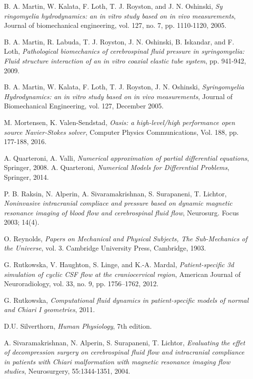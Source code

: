 \documentclass[a4paper,11pt,oneside]{book}
\begin{document}
\begin{thebibliography}{100}
 B. A. Martin, W. Kalata, F. Loth, T. J. Royston, and J. N. Oshinski, \emph{Sy ringomyelia hydrodynamics: an in vitro study based on in vivo measurements}, Journal of biomechanical engineering, vol. 127, no. 7, pp. 1110-1120, 2005.

 B. A. Martin, R. Labuda, T. J. Royston, J. N. Oshinski, B. Iskandar, and F. Loth, \emph{Pathological biomechanics of cerebrospinal fluid pressure in syringomyelia: Fluid structure interaction of an in vitro coaxial elastic tube system}, pp. 941-942, 2009.

 B. A. Martin, W. Kalata, F. Loth, T. J. Royston, J. N. Oshinski, \emph{Syringomyelia Hydrodynamics: an in vitro study based on in vivo measurements}, Journal of Biomechanical Engineering, vol. 127, December 2005.


 M. Mortensen, K. Valen-Sendstad, \emph{Oasis: a high-level/high performance open source Navier-Stokes solver}, Computer Physics Communications, Vol. 188, pp. 177-188, 2016.

 A. Quarteroni, A. Valli, \emph{Numerical approximation of partial differential equations}, Springer, 2008.
 A. Quarteroni, \emph{Numerical Models for Differential Problems}, Springer, 2014.

 P. B. Raksin, N. Alperin, A. Sivaramakrishnan, S. Surapaneni, T. Lichtor, \emph{Noninvasive intracranial compliace and pressure based on dynamic magnetic resonance imaging of blood flow and cerebrospinal fluid flow}, Neurosurg. Focus 2003; 14(4).

 O. Reynolds, \emph{Papers on Mechanical and Physical Subjects, The Sub-Mechanics of the Universe}, vol. 3. Cambridge University Press, Cambridge, 1903.

  G. Rutkowska, V. Haughton, S. Linge, and K.-A. Mardal, \emph{Patient-specific 3d simulation of cyclic CSF flow at the craniocervical region}, American Journal of Neuroradiology, vol. 33, no. 9, pp. 1756–1762, 2012.

 G. Rutkowska, \emph{Computational fluid dynamics in patient-specific models of normal and Chiari I geometries}, 2011.

 D.U. Silverthorn, \emph{Human Physiology}, 7th edition.

 A. Sivaramakrishnan, N. Alperin, S. Surapaneni, T. Lichtor, \emph{Evaluating the effet of decompression surgery on cerebrospinal fluid flow and intracranial compliance in patients with Chiari malformation with magnetic resonance imaging flow studies}, Neurosurgery, 55:1344-1351, 2004.


\end{thebibliography}
\end{document}
